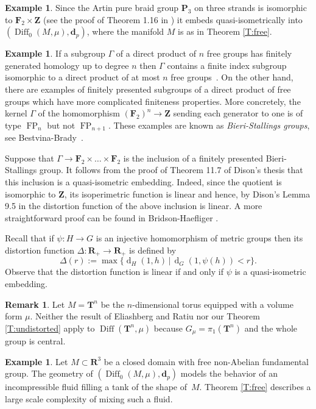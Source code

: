 \documentclass[a4paper,12pt]{amsart}
\def\Diff{\operatorname{Diff}}
\theoremstyle{definition}
\newtheorem{ex}[thm]{Example}
\newtheorem{rem}[thm]{Remark}
\def\OP{\operatorname}
\def\B{\mathbf}
\begin{document}
\begin{ex}\label{E:p3}
Since the Artin pure braid group $\B P_3$ on three strands is
isomorphic to $\B F_2\times {\B Z}$ (see the proof of
Theorem 1.16 in \cite{KT}) it embeds quasi-isometrically
into $(\Diff_0(M,\mu),\B d_p)$, where the manifold $M$ is as in Theorem \ref{T:free}.
\end{ex}

\begin{ex}\label{E:stallings}
If a subgroup $\Gamma$ of a direct product of $n$
free groups has finitely generated homology up to
degree $n$ then $\Gamma$ contains a finite index
subgroup isomorphic to a direct product of at most
$n$ free groups~\cite{BHMS}.
On the other hand, there are examples of finitely
presented subgroups of a direct product of free
groups which have more complicated finiteness
properties. More concretely, the kernel $\Gamma$
of the homomorphism
$(\B F_2)^n \to \B Z$
sending each generator to one is of type
$\OP{FP}_n$ but not $\OP{FP}_{n+1}$.
These examples are known as {\em Bieri-Stallings groups},
see Bestvina-Brady~\cite[Example 6.3]{BB}.

Suppose that  $\Gamma \to \B F_2\times \ldots \times \B F_2$
is the inclusion of a finitely presented Bieri-Stallings group.
It follows from the proof of Theorem 11.7 of Dison's
thesis \cite{Di} that this inclusion is a quasi-isometric
embedding. Indeed, since the quotient is isomorphic to
$\B Z$, its isoperimetric function is linear and hence,
by Dison's Lemma 9.5 in \cite{Di} the distortion function of the
above inclusion is linear. A more straightforward proof can
be found in Bridson-Haefliger \cite[Exercise 5.12(3)]{BH}.
\end{ex}

Recall that if $\psi\colon H\to G$ is an injective homomorphism
of metric groups then its distortion function
$\Delta\colon \B R_+\to \B R_+$ is defined by
$$
\Delta(r) := \max\{\OP{d}_H(1,h)\,|\, \OP{d}_G(1,\psi(h))<r\}.
$$
Observe that the distortion function is linear if and only if
$\psi$ is a quasi-isometric embedding.

\begin{rem}\label{rem:torus}
Let $M=\B T^n$ be the $n$-dimensional torus equipped with
a volume form $\mu$.
Neither the result of Eliashberg and Ratiu nor
our Theorem \ref{T:undistorted} apply to $\Diff(\B T^n,\mu)$ because
$G_{\mu}=\pi_1(\B T^n)$ and the whole group is central.
\end{rem}

\begin{ex}\label{E:domain}
Let $M\subset \B R^3$ be a closed domain with free non-Abelian
fundamental group. The geometry of $(\Diff_0(M,\mu),\B d_p)$
models the behavior of an incompressible fluid
filling a tank of the shape of~$M$. Theorem \ref{T:free}
describes a large scale complexity of mixing such a fluid.
\end{ex}
\end{document}
